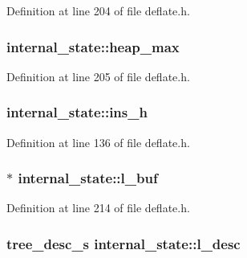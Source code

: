 Definition at line 204 of file deflate.\-h.

\hypertarget{structinternal__state_aa8c78bbfa5d71f3ccc55445a62897f47}{
\subsubsection[{heap\-\_\-max}]{ internal\-\_\-state\-::heap\-\_\-max}}\label{structinternal__state_aa8c78bbfa5d71f3ccc55445a62897f47}


Definition at line 205 of file deflate.\-h.

\hypertarget{structinternal__state_a8cf437698f428195122d3c530929a80c}{
\subsubsection[{ins\-\_\-h}]{ internal\-\_\-state\-::ins\-\_\-h}}\label{structinternal__state_a8cf437698f428195122d3c530929a80c}


Definition at line 136 of file deflate.\-h.

\hypertarget{structinternal__state_a5e6c4269e29696b192e02fd01381e400}{
\subsubsection[{l\-\_\-buf}]{$\ast$ internal\-\_\-state\-::l\-\_\-buf}}\label{structinternal__state_a5e6c4269e29696b192e02fd01381e400}


Definition at line 214 of file deflate.\-h.

\hypertarget{structinternal__state_a0266c4e0250652904e6b4908d8da84a9}{
\subsubsection[{l\-\_\-desc}]{ {\bf tree\-\_\-desc\-\_\-s} internal\-\_\-state\-::l\-\_\-desc}}\label{structinternal__state_a0266c4e0250652904e6b4908d8da84a9}


